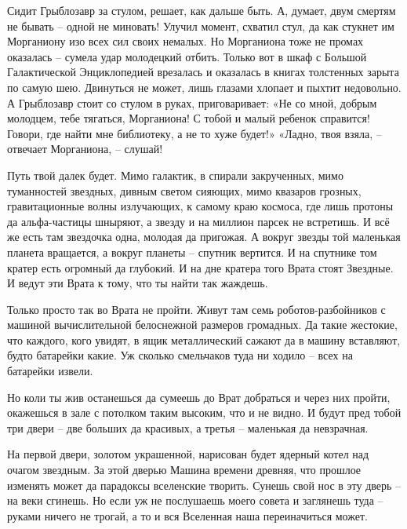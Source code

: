 \documentclass[ebook,oneside,final,openright]{memoir}
\begin{document}
\par
Сидит Грыблозавр за стулом, решает, как дальше быть. А, думает, двум смертям не бывать – одной не миновать! Улучил момент, схватил стул, да как стукнет им Морганиону изо всех сил своих немалых. Но Морганиона тоже не промах оказалась – сумела удар молодецкий отбить. Только вот в шкаф с Большой Галактической Энциклопедией врезалась и оказалась в книгах толстенных зарыта по самую шею. Двинуться не может, лишь глазами хлопает и пыхтит недовольно. А Грыблозавр стоит со стулом в руках, приговаривает: «Не со мной, добрым молодцем, тебе тягаться, Морганиона! С тобой и малый ребенок справится! Говори, где найти мне библиотеку, а не то хуже будет!» «Ладно, твоя взяла, – отвечает Морганиона, – слушай!\par
\par
Путь твой далек будет. Мимо галактик, в спирали закрученных, мимо туманностей звездных, дивным светом сияющих, мимо квазаров грозных, гравитационные волны излучающих, к самому краю космоса, где лишь протоны да альфа-частицы шныряют, а звезду и на миллион парсек не встретишь. И всё же есть там звездочка одна, молодая да пригожая. А вокруг звезды той маленькая планета вращается, а вокруг планеты – спутник вертится. И на спутнике том кратер есть огромный да глубокий. И на дне кратера того Врата стоят Звездные. И ведут эти Врата к тому, что ты найти так жаждешь.\par
\par
Только просто так во Врата не пройти. Живут там семь роботов-разбойников с машиной вычислительной белоснежной размеров громадных. Да такие жестокие, что каждого, кого увидят, в ящик металлический сажают да в машину вставляют, будто батарейки какие. Уж сколько смельчаков туда ни ходило – всех на батарейки извели.\par
\par
Но коли ты жив останешься да сумеешь до Врат добраться и через них пройти, окажешься в зале с потолком таким высоким, что и не видно. И будут пред тобой три двери – две больших да красивых, а третья – маленькая да невзрачная.\par
\par
На первой двери, золотом украшенной, нарисован будет ядерный котел над очагом звездным. За этой дверью Машина времени древняя, что прошлое изменять может да парадоксы вселенские творить. Сунешь свой нос в эту дверь – на веки сгинешь. Но если уж не послушаешь моего совета и заглянешь туда – руками ничего не трогай, а то и вся Вселенная наша переиначиться может.\par
\end{document}
